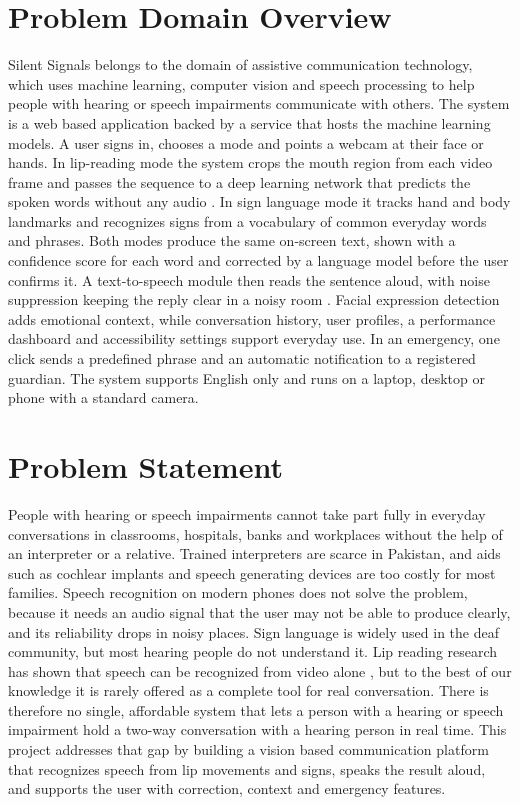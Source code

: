 \documentclass{FastFyp}
\begin{document}
\section{Problem Domain Overview}
Silent Signals belongs to the domain of assistive communication technology, which uses machine learning, computer vision and speech processing to help people with hearing or speech impairments communicate with others. The system is a web based application backed by a service that hosts the machine learning models. A user signs in, chooses a mode and points a webcam at their face or hands. In lip-reading mode the system crops the mouth region from each video frame and passes the sequence to a deep learning network that predicts the spoken words without any audio \cite{assael2016lipnet}. In sign language mode it tracks hand and body landmarks \cite{lugaresi2019mediapipe} and recognizes signs from a vocabulary of common everyday words and phrases. Both modes produce the same on-screen text, shown with a confidence score for each word and corrected by a language model before the user confirms it. A text-to-speech module then reads the sentence aloud, with noise suppression keeping the reply clear in a noisy room \cite{valin2018hybrid}. Facial expression detection adds emotional context, while conversation history, user profiles, a performance dashboard and accessibility settings support everyday use. In an emergency, one click sends a predefined phrase and an automatic notification to a registered guardian. The system supports English only and runs on a laptop, desktop or phone with a standard camera.
\section{Problem Statement}
People with hearing or speech impairments cannot take part fully in everyday conversations in classrooms, hospitals, banks and workplaces without the help of an interpreter or a relative. Trained interpreters are scarce in Pakistan, and aids such as cochlear implants and speech generating devices are too costly for most families. Speech recognition on modern phones does not solve the problem, because it needs an audio signal that the user may not be able to produce clearly, and its reliability drops in noisy places. Sign language is widely used in the deaf community, but most hearing people do not understand it. Lip reading research has shown that speech can be recognized from video alone \cite{assael2016lipnet}, but to the best of our knowledge it is rarely offered as a complete tool for real conversation. There is therefore no single, affordable system that lets a person with a hearing or speech impairment hold a two-way conversation with a hearing person in real time. This project addresses that gap by building a vision based communication platform that recognizes speech from lip movements and signs, speaks the result aloud, and supports the user with correction, context and emergency features.
  
\end{document}
